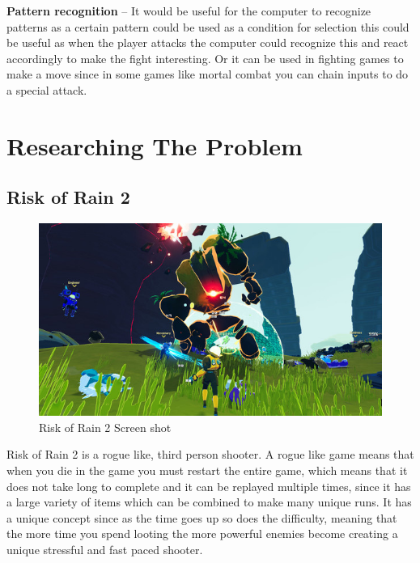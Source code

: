 \documentclass{article}
\begin{document}
\textbf{Pattern recognition} – It would be useful for the computer to recognize patterns as a certain pattern could be used as a condition for selection this could be useful as when the player attacks the computer could recognize this and react accordingly to make the fight interesting. Or it can be used in fighting games to make a move since in some games like mortal combat you can chain inputs to do a special attack.

\section{Researching The Problem}

\subsection{Risk of Rain 2}

\begin{figure}[h]
\includegraphics[width=\linewidth]{ROR 2 ss}
\caption{\cite{ROR2ss} Risk of Rain 2 Screen shot}
\end{figure}
Risk of Rain 2 is a rogue like, third person shooter. A rogue like game means that when you die in the game you must restart the entire game, which means that it does not take long to complete and it can be replayed multiple times, since it has a large variety of items which can be combined to make many unique runs. It has a unique concept since as the time goes up so does the difficulty, meaning that the more time you spend looting the more powerful enemies become creating a unique stressful and fast paced shooter. 
\end{document}
